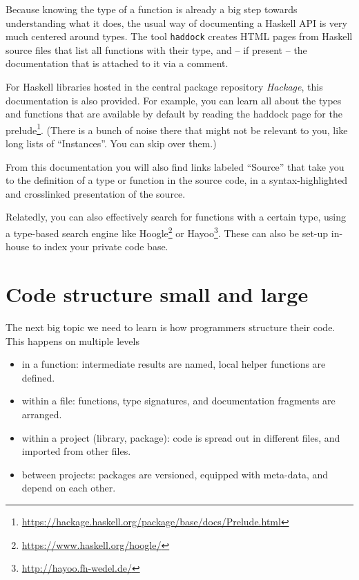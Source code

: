 \documentclass[11pt,
  american,
  DIV13]{article}
\DeclareRobustCommand{\href}[2]{#2\footnote{\url{#1}}}
\providecommand{\tightlist}{%
  \setlength{\itemsep}{0pt}\setlength{\parskip}{0pt}}
\begin{document}
Because knowing the type of a function is already a big step towards
understanding what it does, the usual way of documenting a Haskell API
is very much centered around types. The tool \texttt{haddock} creates
HTML pages from Haskell source files that list all functions with their
type, and -- if present -- the documentation that is attached to it via
a comment.

For Haskell libraries hosted in the central package repository
\emph{Hackage}, this documentation is also provided. For example, you
can learn all about the types and functions that are available by
default by reading the
\href{https://hackage.haskell.org/package/base/docs/Prelude.html}{haddock
page for the prelude}. (There is a bunch of noise there that might not
be relevant to you, like long lists of ``Instances''. You can skip over
them.)

From this documentation you will also find links labeled ``Source'' that
take you to the definition of a type or function in the source code, in
a syntax-highlighted and crosslinked presentation of the source.

Relatedly, you can also effectively search for functions with a certain
type, using a type-based search engine like
\href{https://www.haskell.org/hoogle/}{Hoogle} or
\href{http://hayoo.fh-wedel.de/}{Hayoo}. These can also be set-up
in-house to index your private code base.

\hypertarget{code-structure-small-and-large}{%
\section{Code structure small and
large}\label{code-structure-small-and-large}}

The next big topic we need to learn is how programmers structure their
code. This happens on multiple levels

\begin{itemize}
\tightlist
\item
  in a function: intermediate results are named, local helper functions
  are defined.
\item
  within a file: functions, type signatures, and documentation fragments
  are arranged.
\item
  within a project (library, package): code is spread out in different
  files, and imported from other files.
\item
  between projects: packages are versioned, equipped with meta-data, and
  depend on each other.
\end{itemize}
\end{document}

